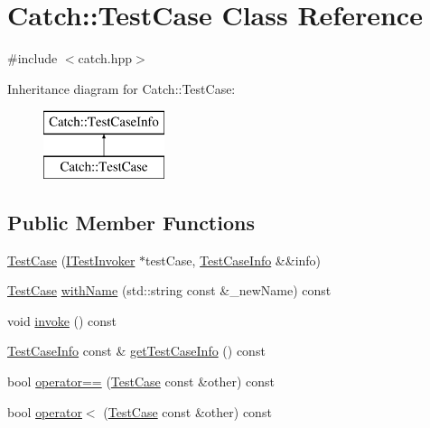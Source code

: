 \hypertarget{class_catch_1_1_test_case}{}\section{Catch\+:\+:Test\+Case Class Reference}
\label{class_catch_1_1_test_case}


{\ttfamily \#include $<$catch.\+hpp$>$}

Inheritance diagram for Catch\+:\+:Test\+Case\+:\begin{figure}[H]
\begin{center}
\leavevmode
\includegraphics[height=2.000000cm]{class_catch_1_1_test_case}
\end{center}
\end{figure}
\subsection*{Public Member Functions}
\begin{DoxyCompactItemize}
\item 
\mbox{\hyperlink{class_catch_1_1_test_case_aae5709fc1cb68e19ab0ac27e1ffd6a76}{Test\+Case}} (\mbox{\hyperlink{struct_catch_1_1_i_test_invoker}{I\+Test\+Invoker}} $\ast$test\+Case, \mbox{\hyperlink{struct_catch_1_1_test_case_info}{Test\+Case\+Info}} \&\&info)
\item 
\mbox{\hyperlink{class_catch_1_1_test_case}{Test\+Case}} \mbox{\hyperlink{class_catch_1_1_test_case_a0812e8a216d09b087d5874687009f0d6}{with\+Name}} (std\+::string const \&\+\_\+new\+Name) const
\item 
void \mbox{\hyperlink{class_catch_1_1_test_case_a26f346c8446dded0562fe3818ae71651}{invoke}} () const
\item 
\mbox{\hyperlink{struct_catch_1_1_test_case_info}{Test\+Case\+Info}} const  \& \mbox{\hyperlink{class_catch_1_1_test_case_a1ea0d79f49156cebea076fe1ba50d2b6}{get\+Test\+Case\+Info}} () const
\item 
bool \mbox{\hyperlink{class_catch_1_1_test_case_a5456d03a90f75292835c158f3a3374a1}{operator==}} (\mbox{\hyperlink{class_catch_1_1_test_case}{Test\+Case}} const \&other) const
\item 
bool \mbox{\hyperlink{class_catch_1_1_test_case_a030e4b9282e9b32e08c8bd5e5cd6fa98}{operator$<$}} (\mbox{\hyperlink{class_catch_1_1_test_case}{Test\+Case}} const \&other) const
\end{DoxyCompactItemize}
